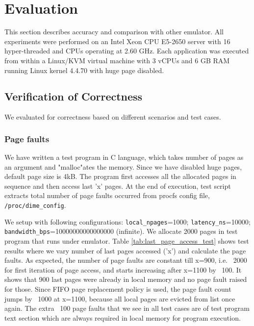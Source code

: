 \chapter{Evaluation}
This section describes {\dime} accuracy and comparison with other emulator.
All experiments were performed on an Intel Xeon CPU E5-2650 server with 16 hyper-threaded and CPUs operating at 2.60 GHz. Each application was executed from within a Linux/KVM virtual machine with 3 vCPUs and 6 GB RAM running Linux kernel 4.4.70 with huge page disabled.

\section{Verification of Correctness}
We evaluated {\dime} for correctness based on different scenarios and test cases.

\subsection{Page faults}
We have written a test program in C language, which takes number of pages as an argument and "malloc"ates the memory. Since we have disabled huge pages, default page size is 4kB. The program first accesses all the allocated pages in sequence and then access last 'x' pages. At the end of execution, test script extracts total number of page faults occurred from {\dime} procfs config file, \verb|/proc/dime_config|.

We setup {\dime} with following configurations: \verb|local_npages|=1000; \verb|latency_ns|=10000; \verb|bandwidth_bps|=10000000000000000 (infinite). We allocate 2000 pages in test program that runs under emulator. Table \ref{tab:last_page_access_test} shows test results where we vary number of last pages accessed ('x') and calculate the page faults. As expected, the number of page faults are constant till x=900, i.e. ~2000 for first iteration of page access, and starts increasing after x=1100 by ~100. It shows that 900 last pages were already in local memory and no page fault raised for those. Since FIFO page replacement policy is used, the page fault count jumps by ~1000 at x=1100, because all local pages are evicted from list once again. The extra ~100 page faults that we see in all test cases are of test program text section which are always required in local memory for program execution.

